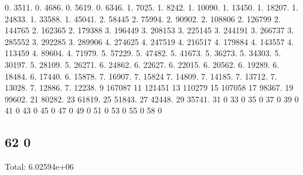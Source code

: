 0. 3511. 0. 4686. 0. 5619. 0. 6346. 1. 7025. 1. 8242. 1. 10090. 1. 13450. 1. 18207. 1. 24833. 1. 33588. 1. 45041. 2. 58445 2. 75994. 2. 90902. 2. 108806 2. 126799 2. 144765 2. 162365 2. 179388 3. 196449 3. 208153 3. 225145 3. 244191 3. 266737 3. 285552 3. 292285 3. 289906 4. 274625 4. 247519 4. 216517 4. 179884 4. 143557 4. 113459 4. 89604. 4. 71979. 5. 57229. 5. 47482. 5. 41673. 5. 36273. 5. 34303. 5. 30197. 5. 28109. 5. 26271. 6. 24862. 6. 22627. 6. 22015. 6. 20562. 6. 19289. 6. 18484. 6. 17440. 6. 15878. 7. 16907. 7. 15824 7. 14809. 7. 14185. 7. 13712. 7. 13028. 7. 12886. 7. 12238. 9 167087 11 121451 13 110279 15 107058 17 98367. 19 99602. 21 80282. 23 61819. 25 51843. 27 42448. 29 35741. 31 0 33 0 35 0 37 0 39 0 41 0 43 0 45 0 47 0 49 0 51 0 53 0 55 0 58 0 \subsection*{62 0 }

Total\+: 6.\+02594e+06 